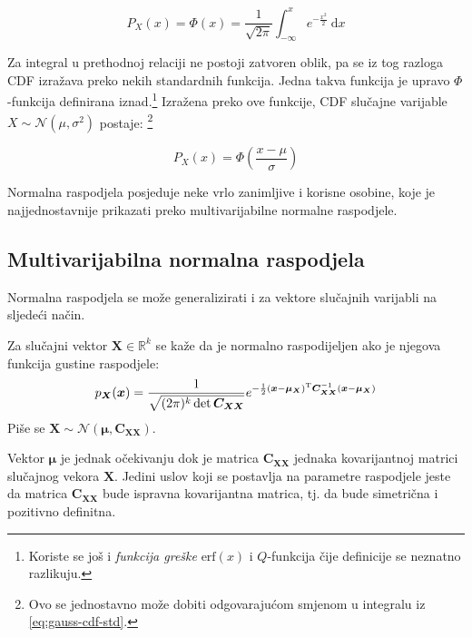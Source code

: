 \begin{equation} \label{eq:gauss-cdf-std}
  P_X(x) = \Phi(x)
  = \frac{1}{\sqrt{2\pi}} \int_{-\infty}^{x} e^{-\frac{x^2}{2}} \ \mathrm dx
\end{equation}

Za integral u prethodnoj relaciji ne postoji zatvoren oblik, pa se iz tog
razloga CDF izražava preko nekih standardnih funkcija. Jedna takva funkcija je
upravo $\Phi$-funkcija definirana iznad.\footnote{Koriste se još i
  \textit{funkcija greške} $\mathrm{erf}(x)$ i $Q$-funkcija čije definicije se
  neznatno razlikuju.} Izražena preko ove funkcije, CDF slučajne varijable $X
  \sim \mathcal{N}(\mu, \sigma^2)$ postaje: \footnote{Ovo se jednostavno može
    dobiti odgovarajućom smjenom u integralu iz \ref{eq:gauss-cdf-std}.}

\begin{equation}
  P_X(x) = \Phi\left(\frac{x-\mu}{\sigma}\right)
\end{equation}

Normalna raspodjela posjeduje neke vrlo zanimljive i korisne osobine, koje je
najjednostavnije prikazati preko multivarijabilne normalne raspodjele.

\subsection{Multivarijabilna normalna raspodjela} \label{sec:gauss-multi}

Normalna raspodjela se može generalizirati i za vektore slučajnih varijabli na
sljedeći način.

\begin{definition}

  Za slučajni vektor $\bm X \in \mathbb{R}^k$ se kaže da je normalno
  raspodijeljen ako je njegova funkcija gustine raspodjele:
  \begin{equation}
    p_{\bm X}(\bm x) 
    = \frac{1}{\sqrt{(2\pi)^k \det \bm C_{\bm X \bm X}}} e^{ -\frac{1}{2}(\bm x -
      \bm\mu_{\bm X})^\text T \bm C_{\bm X \bm X}^{-1} (\bm x - \bm\mu_{\bm X}) }
  \end{equation}
  Piše se $\bm X \sim \mathcal{N}(\bm\mu, \bm C_{\bm X\bm X})$.

\end{definition}

Vektor $\bm\mu$ je jednak očekivanju dok je matrica $\bm C_{\bm X\bm X}$
jednaka kovarijantnoj matrici slučajnog vekora $\bm X$.  Jedini uslov koji se
postavlja na parametre raspodjele jeste da matrica $\bm C_{\bm X\bm X}$ bude
ispravna kovarijantna matrica, tj. da bude simetrična i pozitivno definitna. 

